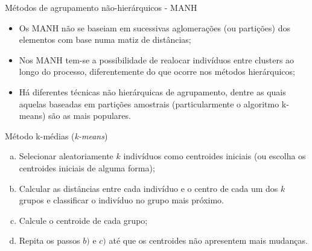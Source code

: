 \documentclass[
  ignorenonframetext,
  aspectratio=169,
]{beamer}
\providecommand{\tightlist}{%
  \setlength{\itemsep}{0pt}\setlength{\parskip}{0pt}}
\begin{document}
\begin{frame}{Métodos de agrupamento não-hierárquicos - MANH}
\protect{}\label{muxe9todos-de-agrupamento-nuxe3o-hieruxe1rquicos---manh}
\begin{itemize}
\tightlist
\item
  Os MANH não se baseiam em sucessivas aglomerações (ou partições) dos
  elementos com base numa matiz de distâncias;
\end{itemize}

\pause

\begin{itemize}
\tightlist
\item
  Nos MANH tem-se a possibilidade de realocar indivíduos entre clusters
  ao longo do processo, diferentemente do que ocorre nos métodos
  hierárquicos;
\end{itemize}

\pause

\begin{itemize}
\tightlist
\item
  Há diferentes técnicas não hierárquicas de agrupamento, dentre as
  quais aquelas baseadas em partições amostrais (particularmente o
  algoritmo k-means) são as mais populares.
\end{itemize}
\end{frame}

\begin{frame}{Método k-médias (\emph{k-means})}
\protect{}\label{muxe9todo-k-muxe9dias-k-means}
\begin{enumerate}
[a)]
\tightlist
\item
  Selecionar aleatoriamente \(k\) indivíduos como centroides iniciais
  (ou escolha os centroides iniciais de alguma forma);
\end{enumerate}

\pause

\begin{enumerate}
[a)]
\setcounter{enumi}{1}
\tightlist
\item
  Calcular as distâncias entre cada indivíduo e o centro de cada um dos
  \(k\) grupos e classificar o indivíduo no grupo mais próximo.
\end{enumerate}

\pause

\begin{enumerate}
[a)]
\setcounter{enumi}{2}
\tightlist
\item
  Calcule o centroide de cada grupo;
\end{enumerate}

\pause

\begin{enumerate}
[a)]
\setcounter{enumi}{3}
\tightlist
\item
  Repita os passos \(b)\) e \(c)\) até que os centroides não apresentem
  mais mudanças.
\end{enumerate}
\end{frame}
\end{document}
